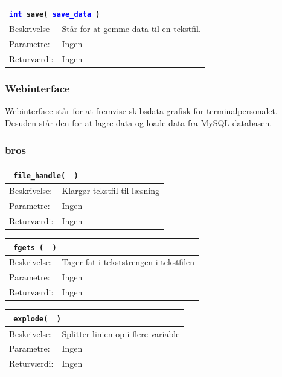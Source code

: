 \begin{table}[H]
\begin{tabular}{l p{12.5cm}}
\multicolumn{2}{l}{\texttt{\textcolor{blue}{int} save( \textcolor{blue}{save\_data} )}} \\
\hline
Beskrivelse & Står for at gemme data til en tekstfil. \\
Parametre: & Ingen\\
Returværdi:& Ingen\\
\end{tabular}
\end{table}

\subsubsection{Webinterface}
Webinterface står for at fremvise skibsdata grafisk for terminalpersonalet. Desuden står den for at lagre data og loade data fra MySQL-databasen.\\

\subsubsection{bros}

\begin{table}[H]
\begin{tabular}{l p{12.5cm}}
\multicolumn{2}{l}{\texttt{\textcolor{blue}{} file\_handle( \textcolor{blue}{} )}} \\
\hline
Beskrivelse:&Klargør tekstfil til læsning\\
Parametre:& Ingen\\
Returværdi:& Ingen\\
\end{tabular}
\end{table}

\begin{table}[H]
\begin{tabular}{l p{12.5cm}}
\multicolumn{2}{l}{\texttt{\textcolor{blue}{} fgets ( \textcolor{blue}{} )}} \\
\hline
Beskrivelse:&Tager fat i tekststrengen i tekstfilen\\
Parametre:& Ingen\\
Returværdi:& Ingen\\
\end{tabular}
\end{table}

\begin{table}[H]
\begin{tabular}{l p{12.5cm}}
\multicolumn{2}{l}{\texttt{\textcolor{blue}{} explode( \textcolor{blue}{} )}} \\
\hline
Beskrivelse: &Splitter linien op i flere variable\\
Parametre: & Ingen\\
Returværdi: & Ingen\\
\end{tabular}
\end{table}

